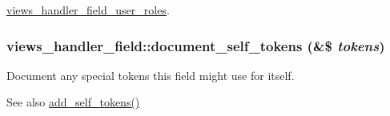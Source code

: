 \hyperlink{classviews__handler__field__user__roles_abf8254566ae390355b35d4593514b033}{views\_\-handler\_\-field\_\-user\_\-roles}.\hypertarget{classviews__handler__field_ae33446d1059f13fbfb06a37da04d320e}{
\subsubsection[{document\_\-self\_\-tokens}]{\setlength{\rightskip}{0pt plus 5cm}views\_\-handler\_\-field::document\_\-self\_\-tokens (\&\$ {\em tokens})}}
\label{classviews__handler__field_ae33446d1059f13fbfb06a37da04d320e}
Document any special tokens this field might use for itself.

\begin{DoxySeeAlso}{See also}
\hyperlink{classviews__handler__field_ac61cc83a4c8c579993a254b5b1e16cbc}{add\_\-self\_\-tokens()} 
\end{DoxySeeAlso}


